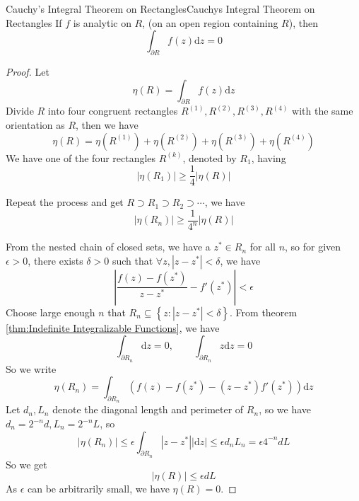 \documentclass[../main.tex]{subfiles}
\begin{document}
\begin{theorem}{Cauchy's Integral Theorem on Rectangles}{Cauchys Integral Theorem on Rectangles}
If $f$ is analytic on $R$, (on an open region containing $R$), then
\begin{equation}
	\int_{\partial R} f(z) \mathrm{d} z = 0
\end{equation}
\end{theorem}
\begin{proof}
Let
\begin{equation*}
	\eta(R) = \int_{\partial R} f(z) \mathrm{d} z
\end{equation*}
Divide $R$ into four congruent rectangles $R^{(1)}, R^{(2)}, R^{(3)}, R^{(4)}$ with the same orientation as $R$, then we have
\begin{equation*}
	\eta(R) = \eta(R^{(1)}) + \eta(R^{(2)}) + \eta(R^{(3)}) + \eta(R^{(4)})
\end{equation*}
We have one of the four rectangles $R^{(k)}$, denoted by $R_1$, having
\begin{equation*}
\left|\eta(R_1)\right| \geq \frac{1}{4} \left|\eta(R)\right|
\end{equation*}

Repeat the process and get $R \supset R_1 \supset R_2 \supset \cdots$, we have
\begin{equation*}
	\left|\eta(R_n)\right| \geq \frac{1}{4^n} \left|\eta(R)\right|
\end{equation*}

From the nested chain of closed sets, we have a $z^*\in R_n$ for all $n$, so for given $\epsilon>0$, there exists $\delta>0$ such that $\forall z, \left|z-z^*\right|<\delta$, we have
\begin{equation*}
\left|\frac{f(z)-f(z^*)}{z-z^*} - f'(z^*)\right| < \epsilon
\end{equation*}
Choose large enough $n$ that $R_n \subseteq \left\{ z: \left|z-z^*\right|<\delta \right\}$. From theorem \ref{thm:Indefinite Integralizable Functions}, we have
\begin{equation*}
	\int_{\partial R_n} \mathrm{d} z = 0, \qquad \int_{\partial R_n} z \mathrm{d} z = 0
\end{equation*}
So we write
\begin{equation*}
	\eta(R_n) = \int_{\partial R_n} \left( f(z) - f(z^*) - (z-z^*) f'(z^*) \right) \mathrm{d} z
\end{equation*}
Let $d_n,L_n$ denote the diagonal length and perimeter of $R_n$, so we have $d_n = 2^{-n}d, L_n = 2^{-n}L$, so
\begin{equation*}
	\left|\eta(R_n)\right| \leq \epsilon \int_{\partial R_n} \left|z-z^*\right| \left|\mathrm{d} z\right| \leq \epsilon d_n L_n = \epsilon 4^{-n} d L
\end{equation*}
So we get
\begin{equation*}
\left|\eta(R)\right| \leq \epsilon dL
\end{equation*}
As $\epsilon$ can be arbitrarily small, we have $\eta(R) = 0$.
\end{proof}
\end{document}
